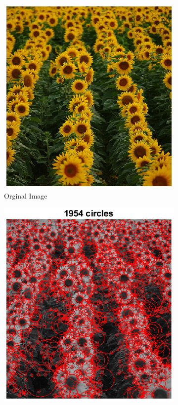 \documentclass{article}
\newcommand{\tl}[1]{\textlatin{#1}}
\begin{document}
	\begin{figure}[H]
		\begin{subfigure}[b]{0.37\textwidth}
			\includegraphics[width=\textwidth]{res/sunflowers.eps}
			\caption{\tl{Orginal Image}}
		\end{subfigure}%
		\begin{subfigure}[b]{0.37\textwidth}
			\includegraphics[width=\textwidth]{res/sunflowers_blob_method2.eps}	

\end{subfigure}
\end{figure}
\end{document}
